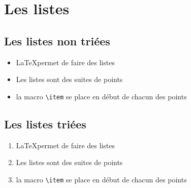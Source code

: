 \documentclass[francais, 10pt]{article}
\begin{document}
	\section{Les listes}
		\subsection{Les listes non triées}
			\begin{itemize}
				\item \LaTeX permet de faire des listes
					\item Les listes sont des suites de points
				\item la macro \verb|\item| se place en début de chacun des points
			\end{itemize}
 		\subsection{Les listes triées}
			\begin{enumerate}
				\item \LaTeX permet de faire des listes
					\item Les listes sont des suites de points
				\item la macro \verb|\item| se place en début de chacun des points
			\end{enumerate}
\end{document}
